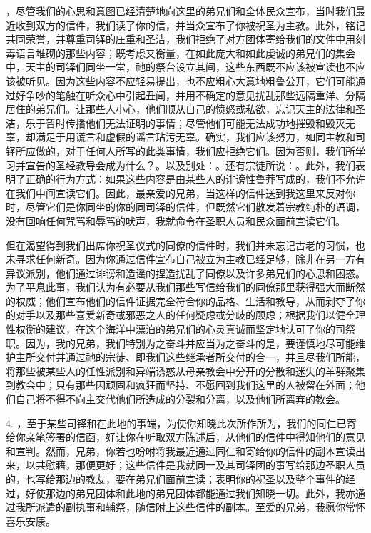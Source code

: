 ，尽管我们的心思和意图已经清楚地向这里的弟兄们和全体民众宣布，当时我们最近收到双方的信件，我们读了你的信，并当众宣布了你被祝圣为主教。此外，铭记共同荣誉，并尊重司铎的庄重和圣洁，我们拒绝了对方团体寄给我们的文件中用刻毒语言堆砌的那些内容；既考虑又衡量，在如此庞大和如此虔诚的弟兄们的集会中，天主的司铎们同坐一堂，祂的祭台设立其间，这些东西既不应该被宣读也不应该被听见。因为这些内容不应轻易提出，也不应粗心大意地粗鲁公开，它们可能通过好争吵的笔触在听众心中引起丑闻，并用不确定的意见扰乱那些远隔重洋、分隔居住的弟兄们。让那些人小心，他们顺从自己的愤怒或私欲，忘记天主的法律和圣洁，乐于暂时传播他们无法证明的事情；尽管他们可能无法成功地摧毁和毁灭无辜，却满足于用谎言和虚假的谣言玷污无辜。确实，我们应该努力，如同主教和司铎所应做的，对于任何人所写的此类事情，我们应拒绝它们。因为否则，我们所学习并宣告的圣经教导会成为什么？。以及别处：。还有宗徒所说：。此外，我们表明了正确的行为方式：如果这些内容是由某些人的诽谤性鲁莽写成的，我们不允许在我们中间宣读它们。因此，最亲爱的兄弟，当这样的信件送到我这里来反对你时，尽管它们是你同坐的你的同司铎的信件，但既然它们散发着宗教纯朴的语调，没有回响任何咒骂和辱骂的吠声，我就命令在圣职人员和民众面前宣读它们。\par

但在渴望得到我们出席你祝圣仪式的同僚的信件时，我们并未忘记古老的习惯，也未寻求任何新奇。因为你通过信件宣布自己被立为主教已经足够，除非在另一方有异议派别，他们通过诽谤和造谣的捏造扰乱了同僚以及许多弟兄们的心思和困惑。为了平息此事，我们认为有必要从我们那些写信给我们的同僚那里获得强大而断然的权威；他们宣布他们的信件证据完全符合你的品格、生活和教导，从而剥夺了你的对手以及那些喜爱新奇或邪恶之人的任何疑虑或分歧的顾虑；根据我们以健全理性权衡的建议，在这个海洋中漂泊的弟兄们的心灵真诚而坚定地认可了你的司祭职。因为，我的兄弟，我们特别为之奋斗并应当为之奋斗的是，要谨慎地尽可能维护主所交付并通过祂的宗徒、即我们这些继承者所交付的合一，并且尽我们所能，将那些被某些人的任性派别和异端诱惑从母亲教会中分开的分散和迷失的羊群聚集到教会中；只有那些因顽固和疯狂而坚持、不愿回到我们这里的人被留在外面；他们自己将不得不向主交代他们所造成的分裂和分离，以及他们所离弃的教会。\par

4. ，至于某些司铎和在此地的事端，为使你知晓此次所作所为，我们的同仁已寄给你亲笔签署的信函，好让你在听取双方陈述后，从他们的信件中得知他们的意见和宣判。然而，兄弟，你若也吩咐将我最近通过同仁和寄给你的信件的副本宣读出来，以共慰藉，那便更好；这些信件是我就同一及其司铎团的事写给那边圣职人员的，也写给那边的教友，要在弟兄们面前宣读；表明你的祝圣以及整个事件的经过，好使那边的弟兄团体和此地的弟兄团体都能通过我们知晓一切。此外，我亦通过我所派遣的副执事和辅祭，随信附上这些信件的副本。至爱的兄弟，我愿你常怀喜乐安康。\par

